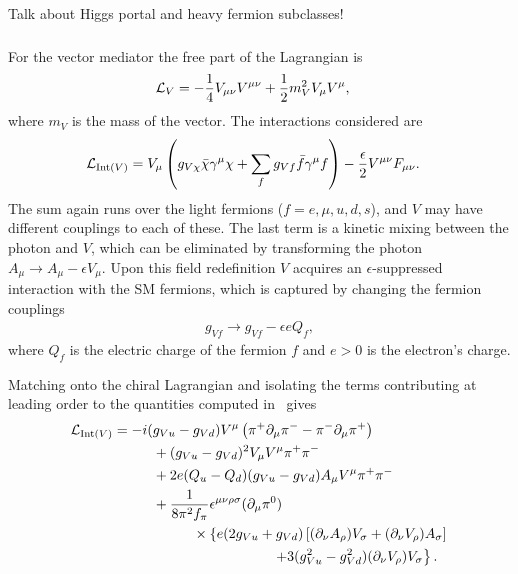 {\color{red} Talk about Higgs portal and heavy fermion subclasses!}

\subsubsection{\vm}

For the vector mediator the free part of the Lagrangian is
\begin{align}
    \mathcal{L}_V & = -\frac{1}{4} V_{\mu\nu} V^{\mu\nu} + \frac{1}{2} m_V^2 V_\mu V^\mu,
\end{align}
where $m_V$ is the mass of the vector. The interactions considered are
\begin{align}
    \mathcal{L}_{{\mathrm{Int}}(V)} & = V_\mu \left( g_{V\chi} \bar{\chi} \gamma^\mu \chi + \sum_f g_{Vf} \bar{f} \gamma^\mu f \right) - \frac{\epsilon}{2} V^{\mu\nu} F_{\mu\nu}.
\end{align}
The sum again runs over the light fermions ($f = e, \mu, u, d, s$), and $V$ may have different couplings to each of these. The last term is a kinetic mixing between the photon and $V$, which can be eliminated by transforming the photon $A_\mu \to A_\mu - \epsilon V_\mu$. Upon this field redefinition $V$ acquires an $\epsilon$-suppressed interaction with the SM fermions, which is captured by changing the fermion couplings
\begin{align}
    g_{Vf} \to g_{Vf} - \epsilon e Q_f,
\end{align}
where $Q_f$ is the electric charge of the fermion $f$ and $e > 0$ is the electron's charge.

Matching onto the chiral Lagrangian and isolating the terms contributing at leading order to the quantities computed in \hazma\ gives
\begin{align}
    \L_{\mathrm{Int}(V)} & = -i (g_{Vu} - g_{Vd}) V^\mu \left( \pi^+ \d_\mu \pi^- - \pi^- \d_\mu \pi^+ \right)                                          \\
                         & \hspace{1cm} + ( g_{Vu} - g_{Vd} )^2 V_\mu V^\mu \pi^+ \pi^-                                                                 \\
                         & \hspace{1cm} + 2 e (Q_u - Q_d) (g_{Vu} - g_{Vd}) A_\mu V^\mu \pi^+ \pi^-                                                     \\
                         & \hspace{1cm} + \frac{1}{8\pi^2 f_\pi} \epsilon^{\mu\nu\rho\sigma} (\d_\mu \pi^0)                                             \\
                         & \hspace{2cm} \times \left\{ e (2 g_{Vu} + g_{Vd}) \left[ (\d_\nu A_\rho) V_\sigma + (\d_\nu V_\rho) A_\sigma \right] \right. \\
                         & \hspace{4cm} \left. + 3 (g_{Vu}^2 - g_{Vd}^2) (\d_\nu V_\rho) V_\sigma \right\}.
\end{align}

